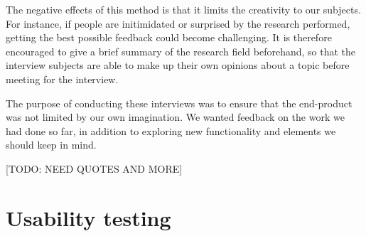 The negative effects of this method is that it limits the creativity to our subjects. For instance, if people are initimidated or surprised by the research performed, getting the best possible feedback could become challenging. It is therefore encouraged to give a brief summary of the research field beforehand, so that the interview subjects are able to make up their own opinions about a topic before meeting for the interview.   

The purpose of conducting these interviews was to ensure that the end-product was not limited by our own imagination. We wanted feedback on the work we had done so far, in addition to exploring new functionality and elements we should keep in mind.

[TODO: NEED QUOTES AND MORE]

\section{Usability testing}


